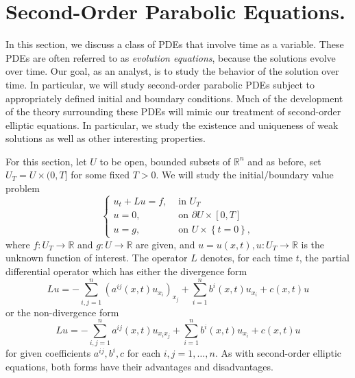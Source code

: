 \documentclass[10pt]{article}
\begin{document}
\section{Second-Order Parabolic Equations.}
In this section, we discuss a class of PDEs that involve time as a variable. These PDEs are often referred to as \textit{evolution equations}, because the solutions evolve over time. Our goal, as an analyst, is to study the behavior of the solution over time. In particular, we will study second-order parabolic PDEs subject to appropriately defined initial and boundary conditions. Much of the development of the theory surrounding these PDEs will mimic our treatment of second-order elliptic equations. In particular, we study the existence and uniqueness of weak solutions as well as other interesting properties. 

For this section, let $U$ to be open, bounded subsets of $\mathbb{R}^n$ and as before, set $U_T = U \times (0,T]$ for some fixed $T > 0$. We will study the initial/boundary value problem 
\begin{equation}	
	\label{parabolic equations, general problem}
	\displaystyle \begin{cases}
		u_t + Lu = f, & \textrm{ in } U_T \\
		u = 0, & \textrm{ on } \partial U \times [0,T] \\
		u = g, & \textrm{ on } U \times \left\{t = 0\right\},  
	\end{cases}
\end{equation}
where $f: U_T \to \mathbb{R}$ and $g: U \to \mathbb{R}$ are given, and $u = u(x,t), u : U_T \to \mathbb{R}$ is the unknown function of interest. The operator $L$ denotes, for each time $t$, the partial differential operator which has either the divergence form 
\begin{equation}
	\label{parabolic equations, divergence form}
	\displaystyle Lu = -\sum\limits_{i,j=1}^{n}{(a^{ij}(x,t)u_{x_i})_{x_j}} + \sum\limits_{i = 1}^{n}{b^i(x,t)u_{x_i}} + c(x,t)u
\end{equation}
or the non-divergence form 
\begin{equation}
	\label{parabolic equations, non-divergence form}
	\displaystyle Lu = -\sum\limits_{i,j=1}^{n}{a^{ij}(x,t)u_{x_ix_j}} + \sum\limits_{i = 1}^{n}{b^i(x,t)u_{x_i}} + c(x,t)u
\end{equation}
for given coefficients $a^{ij}, b^i, c$ for each $i,j=1,\dots,n$. As with second-order elliptic equations, both forms have their advantages and disadvantages. 
\end{document}
